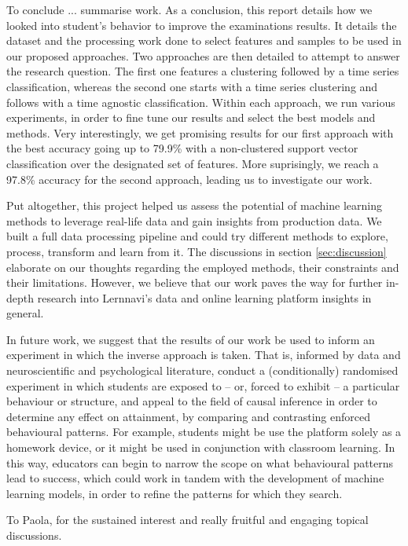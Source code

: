 \documentclass[sigplan,screen]{acmart}
\begin{document}
{\color{red} To conclude ... summarise work}.
As a conclusion, this report details how we looked into student's behavior to improve the examinations results. It details the dataset and the processing work done to select features and samples to be used in our proposed approaches. Two approaches are then detailed to attempt to answer the research question. The first one features a clustering followed by a time series classification, whereas the second one starts with a time series clustering and follows with a time agnostic classification. Within each approach, we run various experiments, in order to fine tune our results and select the best models and methods. Very interestingly, we get promising results for our first approach with the best accuracy going up to 79.9\% with a non-clustered support vector classification over the designated set of features. More suprisingly, we reach a 97.8\% accuracy for the second approach, leading us to investigate our work. 

Put altogether, this project helped us assess the potential of machine learning methods to leverage real-life data and gain insights from production data. We built a full data processing pipeline and could try different methods to explore, process, transform and learn from it. The discussions in section \ref{sec:discussion} elaborate on our thoughts regarding the employed methods, their constraints and their limitations. However, we believe that our work paves the way for further in-depth research into Lernnavi's data and online learning platform insights in general. 

In future work, we suggest that the results of our work be used to inform an experiment in which the inverse approach is taken. That is, informed by data and neuroscientific and psychological literature, conduct a (conditionally) randomised experiment in which students are exposed to -- or, forced to exhibit -- a particular behaviour or structure, and appeal to the field of causal inference in order to determine any effect on attainment, by comparing and contrasting enforced behavioural patterns. For example, students might be use the platform solely as a homework device, or it might be used in conjunction with classroom learning. In this way, educators can begin to narrow the scope on what behavioural patterns lead to success, which could work in tandem with the development of machine learning models, in order to refine the patterns for which they search. 



\begin{acks}
To Paola, for the sustained interest and really fruitful and engaging topical discussions.
\end{acks}
\end{document}
